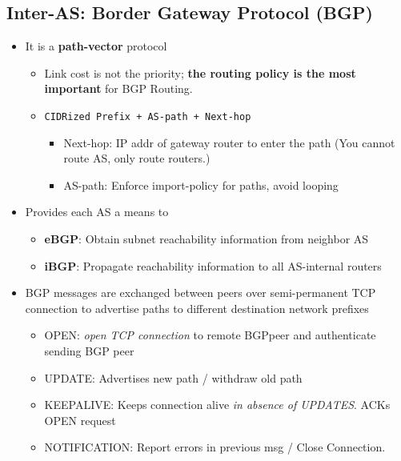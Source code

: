 \documentclass[a4paper]{article}
\begin{document}
\subsection{Inter-AS: Border Gateway Protocol (BGP)}
\begin{itemize}
    \item It is a \textbf{path-vector} protocol
    \begin{itemize}[label=$\circ$]
        \item Link cost is not the priority; \textbf{the routing policy is the most important} for BGP Routing.
        \item \texttt{CIDRized Prefix + AS-path + Next-hop}
        \begin{itemize}[label=\tiny$\blacksquare$]
            \item Next-hop: IP addr of gateway router to enter the path (You cannot route AS, only route routers.)
            \item AS-path: Enforce import-policy for paths, avoid looping
        \end{itemize}
    \end{itemize}
    \item Provides each AS a means to
    \begin{itemize}[label=$\circ$]
        \item \textbf{eBGP}: Obtain subnet reachability information from neighbor AS
        \item \textbf{iBGP}: Propagate reachability information to all AS-internal routers
    \end{itemize}
    \item BGP messages are exchanged between peers over semi-permanent TCP connection to advertise paths to different destination network prefixes
    \begin{itemize}[label=$\circ$]
        \item OPEN: \textit{open TCP connection} to remote BGPpeer and authenticate sending BGP peer
        \item UPDATE: Advertises new path / withdraw old path
        \item KEEPALIVE: Keeps connection alive \textit{in absence of UPDATES}. ACKs OPEN request
        \item NOTIFICATION: Report errors in previous msg / Close Connection.
    \end{itemize}
\end{itemize}
\end{document}
